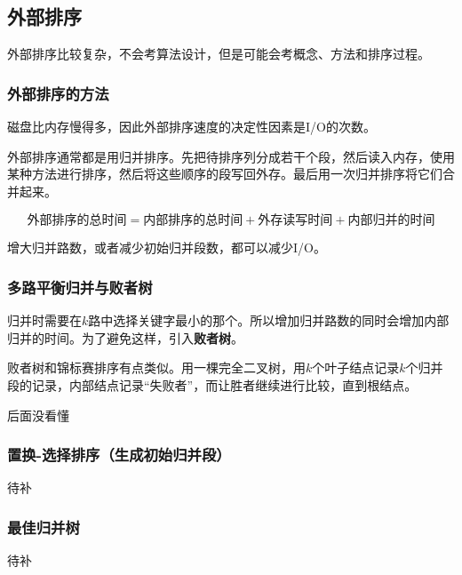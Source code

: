 \documentclass[12pt, a4paper, oneside]{ctexart}
\begin{document}
\subsection{外部排序}

外部排序比较复杂，不会考算法设计，但是可能会考概念、方法和排序过程。

\subsubsection{外部排序的方法}

磁盘比内存慢得多，因此外部排序速度的决定性因素是I/O的次数。

外部排序通常都是用归并排序。先把待排序列分成若干个段，然后读入内存，使用某种方法进行排序，然后将这些顺序的段写回外存。最后用一次归并排序将它们合并起来。

\begin{equation*}
  \text{外部排序的总时间}=\text{内部排序的总时间}+\text{外存读写时间}+\text{内部归并的时间}
\end{equation*}

增大归并路数，或者减少初始归并段数，都可以减少I/O。

\subsubsection{多路平衡归并与败者树}

归并时需要在$k$路中选择关键字最小的那个。所以增加归并路数的同时会增加内部归并的时间。为了避免这样，引入\textbf{败者树}。

败者树和锦标赛排序有点类似。用一棵完全二叉树，用$k$个叶子结点记录$k$个归并段的记录，内部结点记录“失败者”，而让胜者继续进行比较，直到根结点。

后面没看懂

\subsubsection{置换-选择排序（生成初始归并段）}

待补

\subsubsection{最佳归并树}

待补
\end{document}
